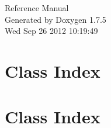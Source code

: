 \documentclass[a4paper]{book}
\begin{document}
\hypersetup{pageanchor=false,citecolor=blue}
\begin{titlepage}
\vspace*{7cm}
\begin{center}
{\Large \-Reference \-Manual}\\
\vspace*{1cm}
{\large \-Generated by Doxygen 1.7.5}\\
\vspace*{0.5cm}
{\small Wed Sep 26 2012 10:19:49}\\
\end{center}
\end{titlepage}
\clearemptydoublepage
{}
\tableofcontents
\clearemptydoublepage
{}
\hypersetup{pageanchor=true,citecolor=blue}
\chapter{\-Class \-Index}

\chapter{\-Class \-Index}

\end{document}

